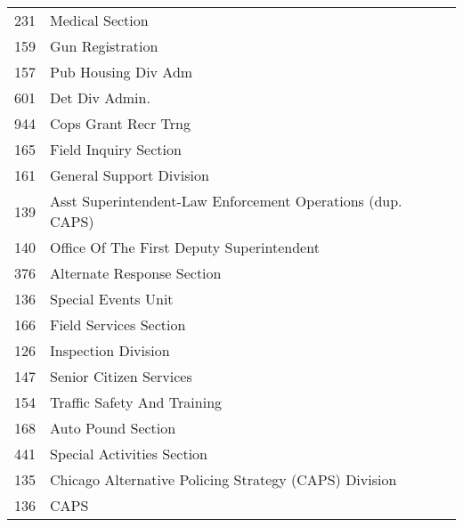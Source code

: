 \begin{table}
\begin{tabular}{|ll|}
231	&Medical Section\\
159	&Gun Registration\\
157	&Pub Housing Div Adm\\
601	&Det Div Admin.\\
944	&Cops Grant Recr Trng\\
165	&Field Inquiry Section\\
161	&General Support Division\\
139	&Asst Superintendent-Law Enforcement Operations (dup. CAPS)\\
140	&Office Of The First Deputy Superintendent\\
376	&Alternate Response Section\\
136	&Special Events Unit\\
166	&Field Services Section\\
126	&Inspection Division\\
147	&Senior Citizen Services\\
154	&Traffic Safety And Training\\
168	&Auto Pound Section\\
441	&Special Activities Section\\
135	&Chicago Alternative Policing Strategy (CAPS) Division\\
136	&CAPS\\
\hline
\end{tabular}
\end{table}


